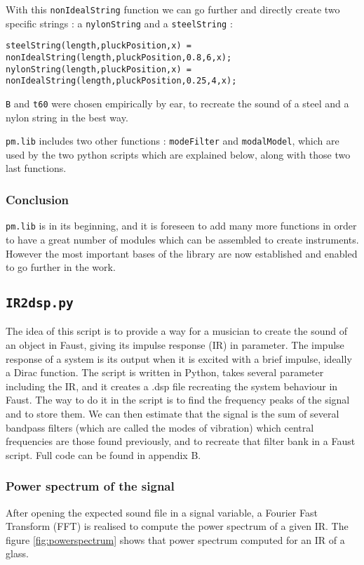 With this \texttt{nonIdealString} function we can go further and directly create two specific strings : a \texttt{nylonString} and a \texttt{steelString} :

\begin{lstlisting}
steelString(length,pluckPosition,x) = nonIdealString(length,pluckPosition,0.8,6,x);
nylonString(length,pluckPosition,x) = nonIdealString(length,pluckPosition,0.25,4,x);
\end{lstlisting}

\texttt{B} and \texttt{t60} were chosen empirically by ear, to recreate the sound of a steel and a nylon string in the best way.

\texttt{pm.lib} includes two other functions : \texttt{modeFilter} and \texttt{modalModel}, which are used by the two python scripts which are explained below, along with those two last functions.

\subsubsection*{Conclusion}

\texttt{pm.lib} is in its beginning, and it is foreseen to add many more functions in order to have a great number of modules which can be assembled to create instruments. However the most important bases of the library are now established and enabled to go further in the work.

\subsection{\texttt{IR2dsp.py}}

The idea of this script is to provide a way for a musician to create the sound of an object in Faust, giving its impulse response (IR) in parameter. The impulse response of a system is its output when it is excited with a brief impulse, ideally a Dirac function. The script is written in Python, takes several parameter including the IR, and it creates a .dsp file recreating the system behaviour in Faust. The way to do it in the script is to find the frequency peaks of the signal and to store them. We can then estimate that the signal is the sum of several bandpass filters (which are called the modes of vibration) which central frequencies are those found previously, and to recreate that filter bank in a Faust script.
Full code can be found in appendix B.

\subsubsection*{Power spectrum of the signal}
After opening the expected sound file in a signal variable, a Fourier Fast Transform (FFT) is realised to compute the power spectrum of a given IR. 
The figure \ref{fig:powerspectrum} shows that power spectrum computed for an IR of a glass.

